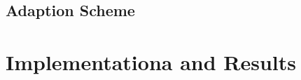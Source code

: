 \documentclass[a4paper,onecolumn,amsmath,amssymb]{revtex4-1}
\begin{document}
\subsection{\textbf{Adaption Scheme}}
\section{\textbf{Implementationa and Results}}














































































 







 


 

 

 




























\begin{thebibliography}{99}

\end{thebibliography}
\end{document}
